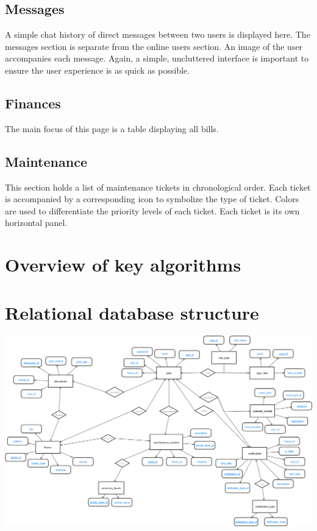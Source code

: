 \documentclass[12pt]{article}
\begin{document}
\subsection{Messages}
A simple chat history of direct messages between two users is displayed here. The messages section is separate from the online users section. An image of the user accompanies each message. Again, a simple, uncluttered interface is important to ensure the user experience is as quick as possible.

\subsection{Finances}
The main focus of this page is a table displaying all bills. 

\subsection{Maintenance}
This section holds a list of maintenance tickets in chronological order. Each ticket is accompanied by a corresponding icon to symbolize the type of ticket. Colors are used to differentiate the priority levels of each ticket. Each ticket is its own horizontal panel. 

%
\section{Overview of key algorithms}

\clearpage
%
\section{Relational database structure}
\includegraphics[scale=0.397, angle=-90, keepaspectratio]{images/ER_Diagram.png}
%
\end{document}
